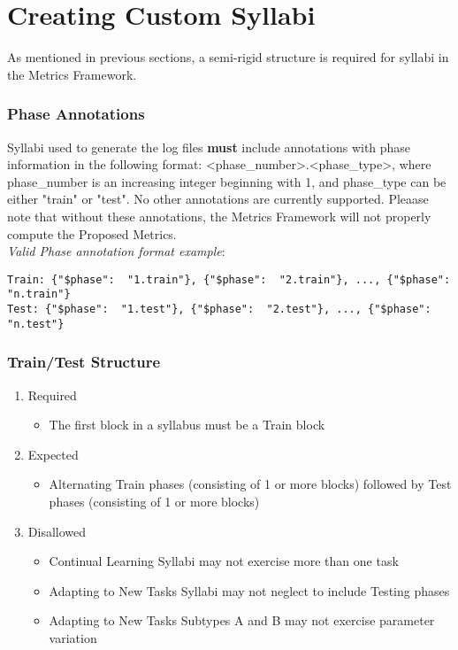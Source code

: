 \chapter{Creating Custom Syllabi}\label{ch:custom_syllabi}

As mentioned in previous sections, a semi-rigid structure is required for syllabi in the Metrics Framework. 

\subsection*{Phase Annotations}

Syllabi used to generate the log files \textbf{must} include annotations with phase information in the following format: <phase\_number>.<phase\_type>, where phase\_number is an increasing integer beginning with 1, and phase\_type can be either "train" or "test". No other annotations are currently supported. Pleaase note that without these annotations, the Metrics Framework will not properly compute the Proposed Metrics. \\[0.1in]


\textit{Valid Phase annotation format example}:\\[0.1in]
\begin{small}
\begin{verbatim}
Train: {"$phase":  "1.train"}, {"$phase":  "2.train"}, ..., {"$phase":  "n.train"}
Test: {"$phase":  "1.test"}, {"$phase":  "2.test"}, ..., {"$phase":  "n.test"}
\end{verbatim}
\end{small}

\subsection*{Train/Test Structure}

\begin{enumerate}
\item Required
\begin{itemize}
\item The first block in a syllabus must be a Train block
\end{itemize}

\item Expected
\begin{itemize}
\item Alternating Train phases (consisting of 1 or more blocks) followed by Test phases (consisting of 1 or more blocks)
\end{itemize}

\item Disallowed
\begin{itemize}
\item Continual Learning Syllabi may not exercise more than one task
\item Adapting to New Tasks Syllabi may not neglect to include Testing phases
\item Adapting to New Tasks Subtypes A and B may not exercise parameter variation
\end{itemize}

\end{enumerate}

